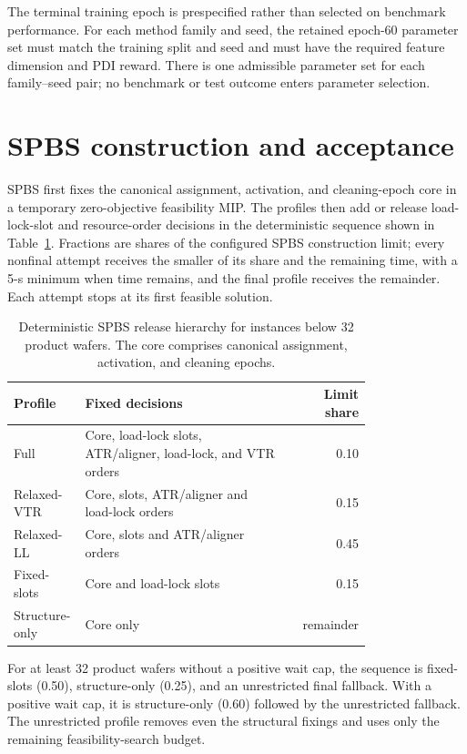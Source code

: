 \documentclass[11pt]{article}
\begin{document}
The terminal training epoch is prespecified rather than selected on benchmark
performance. For each method family and seed, the retained epoch-60 parameter
set must match the training split and seed and must have the required feature
dimension and PDI reward. There is one admissible parameter set for each
family--seed pair; no benchmark or test outcome enters parameter selection.

\section{SPBS construction and acceptance}

SPBS first fixes the canonical assignment, activation, and cleaning-epoch
core in a temporary zero-objective feasibility MIP. The profiles then add or
release load-lock-slot and resource-order decisions in the deterministic
sequence shown in Table~\ref{tab:spbs-profiles}. Fractions are shares of the
configured SPBS construction limit; every nonfinal attempt receives the
smaller of its share and the remaining time, with a 5-s minimum when time
remains, and the final profile receives the remainder. Each attempt stops at
its first feasible solution.

\begin{table}[htbp]
\centering
\caption{Deterministic SPBS release hierarchy for instances below 32 product
wafers. The core comprises canonical assignment, activation, and cleaning
epochs.}
\label{tab:spbs-profiles}
\begin{tabular}{p{0.20\linewidth}p{0.58\linewidth}r}
\toprule
Profile & Fixed decisions & Limit share \\
\midrule
Full & Core, load-lock slots, ATR/aligner, load-lock, and VTR orders & 0.10 \\
Relaxed-VTR & Core, slots, ATR/aligner and load-lock orders & 0.15 \\
Relaxed-LL & Core, slots and ATR/aligner orders & 0.45 \\
Fixed-slots & Core and load-lock slots & 0.15 \\
Structure-only & Core only & remainder \\
\bottomrule
\end{tabular}
\end{table}

For at least 32 product wafers without a positive wait cap, the sequence is
fixed-slots (0.50), structure-only (0.25), and an unrestricted final fallback.
With a positive wait cap, it is structure-only (0.60) followed by the
unrestricted fallback. The unrestricted profile removes even the structural
fixings and uses only the remaining feasibility-search budget.
\end{document}
